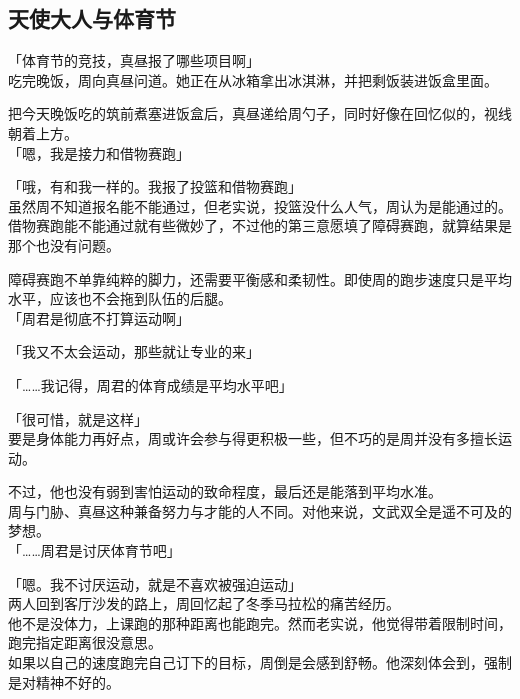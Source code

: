 \subsection{天使大人与体育节}

「体育节的竞技，真昼报了哪些项目啊」\\

吃完晚饭，周向真昼问道。她正在从冰箱拿出冰淇淋，并把剩饭装进饭盒里面。

把今天晚饭吃的筑前煮塞进饭盒后，真昼递给周勺子，同时好像在回忆似的，视线朝着上方。\\

「嗯，我是接力和借物赛跑」

「哦，有和我一样的。我报了投篮和借物赛跑」\\

虽然周不知道报名能不能通过，但老实说，投篮没什么人气，周认为是能通过的。\\

借物赛跑能不能通过就有些微妙了，不过他的第三意愿填了障碍赛跑，就算结果是那个也没有问题。

障碍赛跑不单靠纯粹的脚力，还需要平衡感和柔韧性。即使周的跑步速度只是平均水平，应该也不会拖到队伍的后腿。\\

「周君是彻底不打算运动啊」

「我又不太会运动，那些就让专业的来」

「……我记得，周君的体育成绩是平均水平吧」

「很可惜，就是这样」\\

要是身体能力再好点，周或许会参与得更积极一些，但不巧的是周并没有多擅长运动。

不过，他也没有弱到害怕运动的致命程度，最后还是能落到平均水准。\\

周与门胁、真昼这种兼备努力与才能的人不同。对他来说，文武双全是遥不可及的梦想。\\

「……周君是讨厌体育节吧」

「嗯。我不讨厌运动，就是不喜欢被强迫运动」\\

两人回到客厅沙发的路上，周回忆起了冬季马拉松的痛苦经历。\\

他不是没体力，上课跑的那种距离也能跑完。然而老实说，他觉得带着限制时间，跑完指定距离很没意思。\\

如果以自己的速度跑完自己订下的目标，周倒是会感到舒畅。他深刻体会到，强制是对精神不好的。\\

